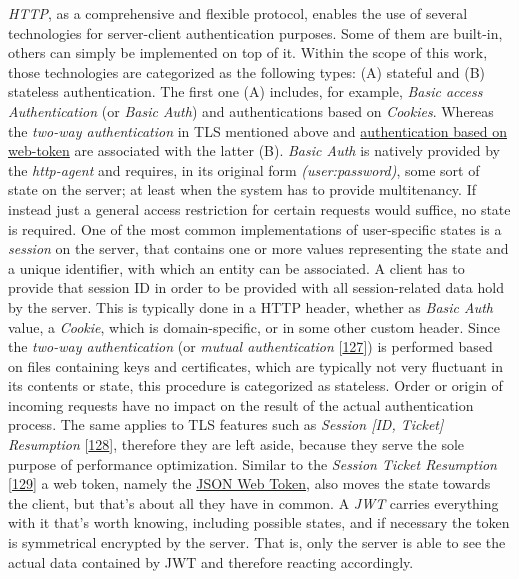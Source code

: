 \documentclass[12pt,english,a4paper,titlepage,cleardoublepage=empty,dottedtoc]{report}
\begin{document}
\emph{HTTP}, as a comprehensive and flexible protocol, enables the use
of several technologies for server-client authentication purposes. Some
of them are built-in, others can simply be implemented on top of it.
Within the scope of this work, those technologies are categorized as the
following types: (A) stateful and (B) stateless authentication. The
first one (A) includes, for example, \emph{Basic access Authentication}
(or \emph{Basic Auth}) and authentications based on \emph{Cookies}.
Whereas the \emph{two-way authentication} in TLS mentioned above and
\protect\hyperlink{def--jwt}{authentication based on web-token} are
associated with the latter (B). \emph{Basic Auth} is natively provided
by the \emph{http-agent} and requires, in its original form
\emph{(user:password)}, some sort of state on the server; at least when
the system has to provide multitenancy. If instead just a general access
restriction for certain requests would suffice, no state is required.
One of the most common implementations of user-specific states is a
\emph{session} on the server, that contains one or more values
representing the state and a unique identifier, with which an entity can
be associated. A client has to provide that session ID in order to be
provided with all session-related data hold by the server. This is
typically done in a HTTP header, whether as \emph{Basic Auth} value, a
\emph{Cookie}, which is domain-specific, or in some other custom header.
Since the \emph{two-way authentication} (or \emph{mutual authentication}
{[}\protect\hyperlink{ref-web_2017_wikipedia_mutual-auth}{127}{]}) is
performed based on files containing keys and certificates, which are
typically not very fluctuant in its contents or state, this procedure is
categorized as stateless. Order or origin of incoming requests have no
impact on the result of the actual authentication process. The same
applies to TLS features such as \emph{Session {[}ID, Ticket{]}
Resumption}
{[}\protect\hyperlink{ref-book_2013_networking-101_tls-session-resumption}{128}{]},
therefore they are left aside, because they serve the sole purpose of
performance optimization. Similar to the \emph{Session Ticket
Resumption}
{[}\protect\hyperlink{ref-web_spec_tls-session-ticket-resumption}{129}{]}
a web token, namely the \protect\hyperlink{def--jwt}{JSON Web Token},
also moves the state towards the client, but that's about all they have
in common. A \emph{JWT} carries everything with it that's worth knowing,
including possible states, and if necessary the token is symmetrical
encrypted by the server. That is, only the server is able to see the
actual data contained by JWT and therefore reacting accordingly.
\end{document}
